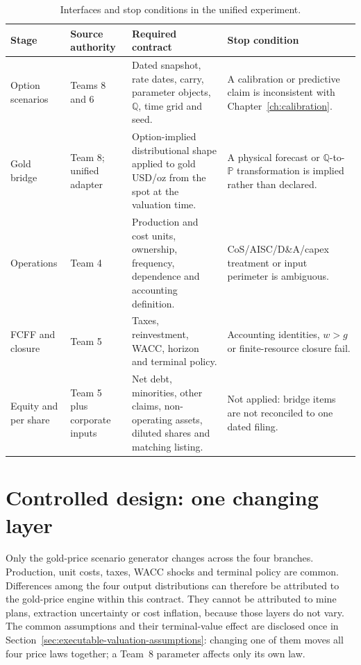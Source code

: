 \begin{table}[H]
\centering
\caption{Interfaces and stop conditions in the unified experiment.}
\label{tab:unified-interface-contract}
\scriptsize
\setlength{\tabcolsep}{3pt}
\renewcommand{\arraystretch}{1.10}
\begin{tabularx}{\textwidth}{@{}p{2.15cm}p{2.15cm}X X@{}}
\toprule
Stage & Source authority & Required contract & Stop condition \\
\midrule
Option scenarios & Teams 8 and 6 & Dated snapshot, rate dates, carry, parameter
objects, \(\mathbb Q\), time grid and seed. & A calibration or predictive
claim is inconsistent with Chapter~\ref{ch:calibration}. \\
Gold bridge & Team 8; unified adapter & Option-implied distributional shape
applied to gold USD/oz from the spot at the valuation time. & A physical
forecast or \(\mathbb Q\)-to-\(\mathbb P\) transformation is implied rather
than declared. \\
Operations & Team 4 & Production and cost units, ownership, frequency,
dependence and accounting definition. & CoS/AISC/D\&A/capex treatment or input
perimeter is ambiguous. \\
FCFF and closure & Team 5 & Taxes, reinvestment, WACC, horizon and terminal
policy. & Accounting identities, \(w>g\) or finite-resource closure fail. \\
Equity and per share & Team 5 plus corporate inputs & Net debt, minorities,
other claims, non-operating assets, diluted shares and matching listing. &
Not applied: bridge items are not reconciled to one dated filing. \\
\bottomrule
\end{tabularx}
\end{table}

\section{Controlled design: one changing layer}
\label{sec:controlled-design}

Only the gold-price scenario generator changes across the four branches.
Production, unit costs, taxes, WACC shocks and terminal policy are common.
Differences among the four output distributions can therefore be attributed
to the gold-price engine within this contract. They cannot be attributed to
mine plans, extraction uncertainty or cost inflation, because those layers do
not vary. The common assumptions and their terminal-value effect are
disclosed once in Section~\ref{sec:executable-valuation-assumptions}: changing
one of them moves all four price laws together; a Team~8 parameter affects
only its own law.

